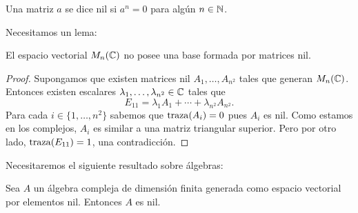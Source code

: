 Una matriz $a$ se dice nil si $a^n=0$ para algún $n\in\mathbb{N}$. 

Necesitamos un lema:

\begin{lemma}
	\label{lem:base_de_nilpotentes}
	El espacio vectorial $M_n(\mathbb{C})$ no posee una base formada por matrices
	nil.
\end{lemma}

\begin{proof}
	Supongamos que existen matrices nil $A_1,\dots,A_{n^2}$ tales que
	generan $M_n(\mathbb{C})$. Entonces existen escalares
	$\lambda_1,\dots,\lambda_{n^2}\in \mathbb{C}$ tales que
	\[
		E_{11}=\lambda_1A_1+\cdots+\lambda_{n^2}A_{n^2}.
	\]
	Para cada $i\in\{1,\dots,n^2\}$ sabemos que $\operatorname{traza}(A_i)=0$ pues $A_i$ es
	nil. Como estamos en los complejos, $A_i$ es similar a una
	matriz triangular superior. Pero por otro lado, $\operatorname{traza}(E_{11})=1$, una
	contradicción.
\end{proof}

Necesitaremos el siguiente resultado sobre álgebras:

\begin{theorem}[Wedderburn]
	Sea $A$ un álgebra compleja de dimensión finita generada como espacio vectorial por
	elementos nil. Entonces $A$ es nil.
\end{theorem}

